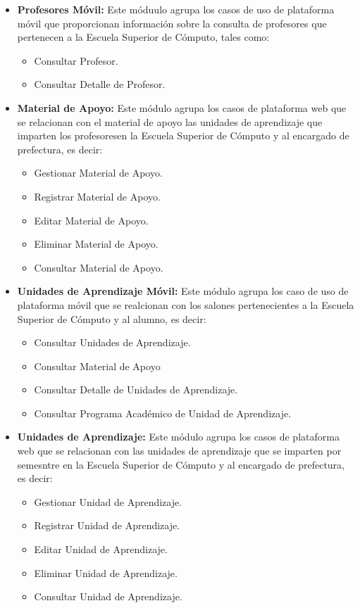 \begin{itemize}
	\item {\bf Profesores Móvil:} Este móduulo agrupa los casos de uso de plataforma móvil que proporcionan información sobre la consulta de profesores que pertenecen a la Escuela Superior de Cómputo, tales como:
\begin{itemize}
	\item Consultar Profesor.
	\item Consultar Detalle de Profesor.
\end{itemize} 

\item {\bf Material de Apoyo:} Este módulo agrupa los casos de plataforma web  que se relacionan con el material de apoyo las unidades de aprendizaje que imparten los profesoresen la Escuela Superior de Cómputo y al encargado de prefectura, es decir:
\begin{itemize}
	\item Gestionar Material de Apoyo.
	\item Registrar Material de Apoyo.
	\item Editar Material de Apoyo.
	\item Eliminar Material de Apoyo.
	\item Consultar Material de Apoyo.
\end{itemize}

	\item {\bf Unidades de Aprendizaje Móvil:} Este módulo agrupa los caso de uso de plataforma móvil que se realcionan con los salones pertenecientes a la Escuela Superior de Cómputo y al alumno, es decir:
\begin{itemize}
	\item Consultar Unidades de Aprendizaje.
	\item Consultar Material de Apoyo
	\item Consultar Detalle de Unidades de Aprendizaje.
	\item Consultar Programa Académico de Unidad de Aprendizaje.
\end{itemize}

	\item {\bf Unidades de Aprendizaje:} Este módulo agrupa los casos de plataforma web  que se relacionan con las unidades de aprendizaje que se imparten por semesntre en la Escuela Superior de Cómputo y al encargado de prefectura, es decir:
\begin{itemize}
	\item Gestionar Unidad de Aprendizaje.
	\item Registrar Unidad de Aprendizaje.
	\item Editar Unidad de Aprendizaje.
	\item Eliminar Unidad de Aprendizaje.
	\item Consultar Unidad de Aprendizaje.
\end{itemize}


\end{itemize}
